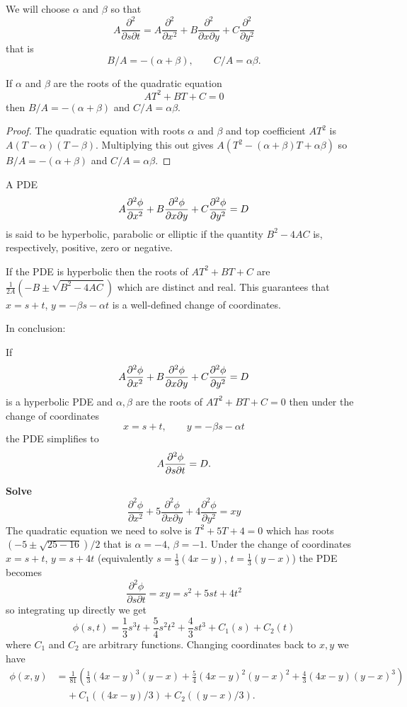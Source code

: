 We will choose $\alpha$ and $\beta$ so that
\[A\frac{\partial^2}{\partial s\partial t}=A\frac{\partial^2}{\partial x^2}+B\frac{\partial^2}{\partial x\partial y}+C\frac{\partial^2}{\partial y^2}\]
that is
\[B/A=-(\alpha+\beta),\qquad C/A=\alpha\beta.\]
\begin{lma}
If $\alpha$ and $\beta$ are the roots of the quadratic equation
\[AT^2+BT+C=0\]
then $B/A=-(\alpha+\beta)$ and $C/A=\alpha\beta$.
\end{lma}
\begin{proof}
The quadratic equation with roots $\alpha$ and $\beta$ and top coefficient $AT^2$ is $A(T-\alpha)(T-\beta)$. Multiplying this out gives $A(T^2-(\alpha+\beta)T+\alpha\beta)$ so $B/A=-(\alpha+\beta)$ and $C/A=\alpha\beta$.
\end{proof}
\begin{dfn}
A PDE
\[A\frac{\partial^2 \phi}{\partial x ^2}+B\frac{\partial^2 \phi}{\partial x\partial y}+C\frac{\partial^2 \phi}{\partial y ^2}=D\]
is said to be hyperbolic, parabolic or elliptic if the quantity $B^2-4AC$ is, respectively, positive, zero or negative.
\end{dfn}
\begin{rmk}
If the PDE is hyperbolic then the roots of $AT^2+BT+C$ are $\tfrac{1}{2A}\left(-B\pm\sqrt{B^2-4AC}\right)$ which are distinct and real. This guarantees that $x=s+t$, $y=-\beta s-\alpha t$ is a well-defined change of coordinates.
\end{rmk}
In conclusion:
\begin{prp}
If
\[A\frac{\partial^2 \phi}{\partial x ^2}+B\frac{\partial^2 \phi}{\partial x\partial y}+C\frac{\partial^2 \phi}{\partial y ^2}=D\]
is a hyperbolic PDE and $\alpha,\beta$ are the roots of $AT^2+BT+C=0$ then under the change of coordinates
\[x=s+t,\qquad y=-\beta s-\alpha t\]
the PDE simplifies to
\[A\frac{\partial^2 \phi}{\partial s\partial t}=D.\]
\end{prp}

\begin{exm}
{\bf Solve}
\[\frac{\partial^2\phi}{\partial x^2}+5\frac{\partial^2\phi}{\partial x\partial y}+4\frac{\partial^2\phi}{\partial y^2}=xy\]
The quadratic equation we need to solve is $T^2+5T+4=0$ which has roots $(-5\pm\sqrt{25-16})/2$ that is $\alpha=-4$, $\beta=-1$. Under the change of coordinates $x=s+t$, $y=s+4t$ (equivalently $s=\tfrac{1}{3}(4x-y)$, $t=\tfrac{1}{3}(y-x)$) the PDE becomes
\[\frac{\partial^2\phi}{\partial s\partial t}=xy=s^2+5st+4t^2\]
so integrating up directly we get
\[\phi(s,t)=\frac{1}{3}s^3t+\frac{5}{4}s^2t^2+\frac{4}{3}st^3+C_1(s)+C_2(t)\]
where $C_1$ and $C_2$ are arbitrary functions. Changing coordinates back to $x,y$ we have
\begin{align*}
\phi(x,y)&=\frac{1}{81}\left(\frac{1}{3}(4x-y)^3(y-x)+\frac{5}{4}(4x-y)^2(y-x)^2+\frac{4}{3}(4x-y)(y-x)^3\right)\\
&\ \ \ \ \ +C_1((4x-y)/3)+C_2((y-x)/3).
\end{align*}
\end{exm}

